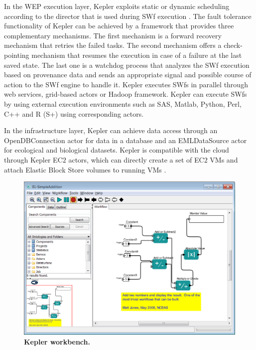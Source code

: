 In the WEP execution layer, Kepler exploits static or dynamic scheduling according to the director that is used during SWf execution \cite{Ludascher2006,Bux2013}.
The fault tolerance functionality of Kepler can be achieved
by a framework that provides three complementary mechanisms. The first
mechanism is a forward recovery mechanism that retries the failed
tasks. The second mechanism offers a check-pointing mechanism that
resumes the execution in case of a failure at the last saved 
state. The last one is a watchdog process that analyzes the SWf
execution based on provenance data and sends an appropriate signal
and possible course of action to the SWf engine to handle it. 
Kepler executes SWfs in parallel through web services, 
grid-based actors or Hadoop framework.
Kepler can execute SWfs by using external execution environments such as SAS, Matlab,
Python, Perl, C++ and R (S+) using corresponding actors.

In the infrastructure layer, Kepler can achieve data access through an OpenDBConnection actor for data in a database and an EMLDataSource actor for ecological and biological datasets. Kepler is compatible with the cloud through Kepler EC$2$ actors, which can directly create a set of EC$2$ VMs and attach Elastic Block Store volumes to running VMs \cite{Wang2012}. 

\begin{figure}
\begin{centering}
\captionsetup{justification=centering}
\includegraphics[width=129mm]{figures/f12}
\par\end{centering}

\caption{\textbf{Kepler workbench. }}
\label{fig:f12} 
\end{figure}


